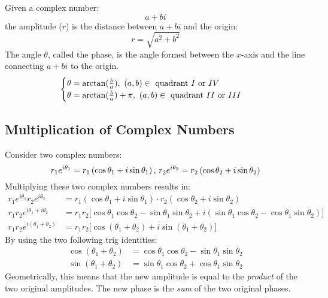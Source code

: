 \documentclass[12pt]{article}
\begin{document}
Given a complex number:
\begin{equation*}
  a + bi
\end{equation*}
the amplitude ($r$) is the distance between $a+bi$ and the origin:
\begin{equation*}
  r = \sqrt{a^2 + b^2}
\end{equation*}
The angle $\theta$, called the phase, is the angle formed between the $x$-axis and the line connecting $a+bi$ to the origin.
\[
  \begin{cases} 
    \theta = \arctan(\frac{b}{a}),\ (a,b) \in \textup{ quadrant } I \textup{ or } IV \\
    \theta = \arctan(\frac{b}{a}) + \pi,\ (a,b) \in \textup{ quadrant } II \textup{ or } III
  \end{cases}
\]

\subsection{Multiplication of Complex Numbers}
\label{ssec:multiplicationOfComplexNumbers}

Consider two complex numbers:
\begin{equation*}
  r_1e^{i \theta_1} = r_1 \left( \cos \theta_1 + i\sin \theta_1 \right)\textup{,}\ r_2e^{i \theta_2} = r_2 \left( \cos \theta_2 + i\sin \theta_2 \right)
\end{equation*}
Multiplying these two complex numbers results in:
\begin{align*}
  r_1e^{i\theta_1}r_2e^{i\theta_2} &= r_1 \left( \cos \theta_1 + i\sin \theta_1 \right) \cdot r_2 \left( \cos \theta_2 + i\sin \theta_2 \right) \\
  r_1r_2e^{i\theta_1 + i\theta_2}  &= r_1r_2 \big[ \cos \theta_1\cos \theta_2 - \sin \theta_1\sin \theta_2 + i\left(\sin \theta_1\cos \theta_2 - \cos \theta_1\sin \theta_2 \right) \big] \\
  r_1r_2e^{i(\theta_1 + \theta_2)} &= r_1r_2 \big[ \cos(\theta_1 + \theta_2) + i\sin(\theta_1 + \theta_2)\big]
\end{align*}
By using the two following trig identities:
\begin{align*}
  \cos(\theta_1 + \theta_2) &= \cos \theta_1 \cos \theta_2 - \sin \theta_1 \sin \theta_2 \\
  \sin(\theta_1 + \theta_2) &= \sin \theta_1 \cos \theta_2 + \cos \theta_1 \sin \theta_2
\end{align*}
Geometrically, this means that the new amplitude is equal to the \textit{product} of the two original amplitudes. The new phase is the \textit{sum} of the two original phases.
\end{document}
